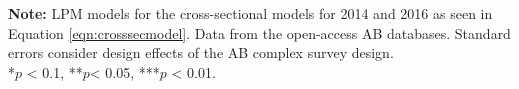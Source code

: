 \documentclass[12pt,a4]{article}
\begin{document}
\begin{table}[htbp]
\begin{center}
\end{center}
\textbf{Note:} LPM models for the cross-sectional models for 2014 and 2016 as seen in Equation \ref{eqn:crosssecmodel}. Data from the open-access AB databases. Standard errors consider design effects of the AB complex survey design.\\
*$p$ < 0.1, **$p$< 0.05, ***$p$ < 0.01.
\end{table}
\end{document}
